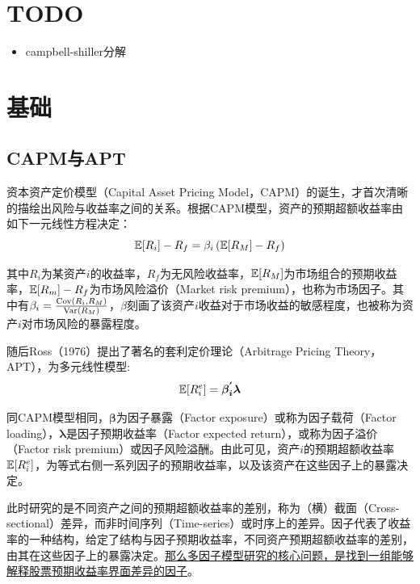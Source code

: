 \documentclass[11pt]{article}
\begin{document}
\maketitle
\tableofcontents

\section{TODO}
\begin{itemize}
    \item campbell-shiller分解
\end{itemize}

\section{基础}

\subsection{CAPM与APT}

资本资产定价模型（Capital Asset Pricing Model，CAPM）的诞生，才首次清晰的描绘出风险与收益率之间的关系。根据CAPM模型，资产的预期超额收益率由如下一元线性方程决定：
\begin{equation*}
    \mathbb{E}[R_i] - R_f = \beta_i \left( \mathbb{E}[R_M]-R_f \right)
\end{equation*}

其中$R_i$为某资产$i$的收益率，$R_f$为无风险收益率，$\mathbb{E}[R_M]$为市场组合的预期收益率，$\mathbb{E}[R_m]- R_f$为市场风险溢价（Market risk premium），也称为市场因子。其中有$\beta_i = \frac{\operatorname{Cov}(R_i,R_M)}{\operatorname{Var}(R_M)}$，$\beta$刻画了该资产$i$收益对于市场收益的敏感程度，也被称为资产$i$对市场风险的暴露程度。

随后Ross（1976）提出了著名的套利定价理论（Arbitrage Pricing Theory，APT），为多元线性模型:
\begin{equation*}
    \mathbb{E}[R_i^e] = \bm{\beta_{i}^{'} \lambda}
\end{equation*}

同CAPM模型相同，$\bm{\beta}$为因子暴露（Factor exposure）或称为因子载荷（Factor loading），$\bm{\lambda}$是因子预期收益率（Factor expected return），或称为因子溢价（Factor risk premium）或因子风险溢酬。由此可见，资产$i$的预期超额收益率$\mathbb{E}[R_i^e]$，为等式右侧一系列因子的预期收益率，以及该资产在这些因子上的暴露决定。

此时研究的是不同资产之间的预期超额收益率的差别，称为（横）截面（Cross-sectional）差异，而非时间序列（Time-series）或时序上的差异。因子代表了收益率的一种结构，给定了结构与因子预期收益率，不同资产预期超额收益率的差别，由其在这些因子上的暴露决定。\uline{那么多因子模型研究的核心问题，是找到一组能够解释股票预期收益率界面差异的因子}。
\end{document}
